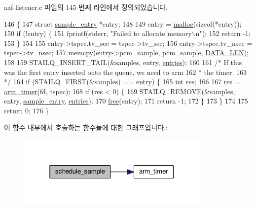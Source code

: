 aaf-\/listener.\+c 파일의 145 번째 라인에서 정의되었습니다.


\begin{DoxyCode}
146 \{
147     \textcolor{keyword}{struct }\hyperlink{structsample__entry}{sample\_entry} *entry;
148 
149     entry = \hyperlink{_memory_leak_detector_malloc_macros_8h_ab8b25cd8f16d4a6552afe4e65c4f082d}{malloc}(\textcolor{keyword}{sizeof}(*entry));
150     \textcolor{keywordflow}{if} (!entry) \{
151         fprintf(stderr, \textcolor{stringliteral}{"Failed to allocate memory\(\backslash\)n"});
152         \textcolor{keywordflow}{return} -1;
153     \}
154 
155     entry->tspec.tv\_sec = tspec->tv\_sec;
156     entry->tspec.tv\_nsec = tspec->tv\_nsec;
157     memcpy(entry->pcm\_sample, pcm\_sample, \hyperlink{aaf-listener_8c_af02e45f15080b8ec9dd7b286157617ff}{DATA\_LEN});
158 
159     STAILQ\_INSERT\_TAIL(&samples, entry, \hyperlink{avtp__rx_8c_a76565232f25302e8cb99c60a629034cc}{entries});
160 
161     \textcolor{comment}{/* If this was the first entry inserted onto the queue, we need to arm}
162 \textcolor{comment}{     * the timer.}
163 \textcolor{comment}{     */}
164     \textcolor{keywordflow}{if} (STAILQ\_FIRST(&samples) == entry) \{
165         \textcolor{keywordtype}{int} res;
166 
167         res = \hyperlink{aaf-listener_8c_a4087791d7eed1c4cdfa65b841601c5a0}{arm\_timer}(fd, tspec);
168         \textcolor{keywordflow}{if} (res < 0) \{
169             STAILQ\_REMOVE(&samples, entry, \hyperlink{structsample__entry}{sample\_entry}, \hyperlink{avtp__rx_8c_a76565232f25302e8cb99c60a629034cc}{entries});
170             \hyperlink{_memory_leak_detector_malloc_macros_8h_aa7157aa9480bb73f090dca36776419bf}{free}(entry);
171             \textcolor{keywordflow}{return} -1;
172         \}
173     \}
174 
175     \textcolor{keywordflow}{return} 0;
176 \}
\end{DoxyCode}


이 함수 내부에서 호출하는 함수들에 대한 그래프입니다.\+:
\nopagebreak
\begin{figure}[H]
\begin{center}
\leavevmode
\includegraphics[width=268pt]{aaf-listener_8c_a4d4e3f1353c49077c865384052a66aa2_cgraph}
\end{center}
\end{figure}




